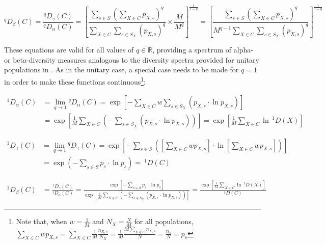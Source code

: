 \begin{equation}
^qD_\beta(C) = \frac{^qD_\gamma(C)}{^qD_\alpha(C)}
= \left[
\frac{\displaystyle\sum_{s \in S}\left(\sum_{X \in C} p_{X,s}\right)^q}{\displaystyle \sum_{X \in C}\sum_{s \in S_X} (p_{X,s})^q}
\times
\frac{\displaystyle M}{\displaystyle M^q}
\right]^\frac{1}{1-q}
= \left[
\frac{\displaystyle\sum_{s \in S}\left(\sum_{X \in C} p_{X,s}\right)^q}{\displaystyle M^{q-1} \sum_{X \in C}\sum_{s \in S_X} (p_{X,s})^q}
\right]^\frac{1}{1-q}
\label{eq:diversity_beta_even}
\end{equation}

These equations are valid for all values of $q \in \mathbb{R}$, providing a spectrum of alpha- or beta-diversity measures analogous to the diversity spectra provided for unitary populations in . As in the unitary case, a special case needs to be made for $q = 1$ in order to make these functions continuous\footnote{Note that, when $w = \frac{1}{M}$ and $N_X = \frac{N}{M}$ for all populations, $\displaystyle\sum_{X \in C}wp_{X,s} = \sum_{X \in C}\frac{1}{M}\frac{n_{X,s}}{N_X} = \frac{1}{M}\frac{M \sum_{X \in C} n_{X,s}}{N} = \frac{n_{s}}{N} = p_s$}:

\begin{equation}
\begin{split}
^1D_\alpha(C) & = \lim_{q \to 1} {^qD}_\alpha(C)
= \exp\left[-\sum_{X \in C}w\sum_{s \in S_X}(p_{X,s}\cdot\ln p_{X,s})\right]\\
 & = \exp\left[\frac{1}{M}\sum_{X \in C}\left(-\sum_{s \in S_X}(p_{X,s}\cdot\ln p_{X,s})\right)\right] = \exp\left[\frac{1}{M}\sum_{X \in C}\ln\,^1D(X)\right]
\end{split}
\label{eq:diversity_alpha_q1}
\end{equation}

\begin{equation}
\begin{split}
^1D_\gamma(C) & = \lim_{q \to 1} {^qD}_\gamma(C)
= \exp\left[-\sum_{s \in S}\left(\left[\sum_{X \in C}wp_{X,s}\right]\cdot\ln \left[\sum_{X \in C}wp_{X,s}\right]\right)\right]\\
& = \exp\left(-\sum_{s \in S}p_s \cdot\ln p_s\right) =\:^1D(C)
\end{split}
\label{eq:diversity_gamma_q1}
\end{equation}

\begin{equation}
\begin{split}
^1D_\beta(C) & = \frac{^1D_\gamma(C)}{^1D_\alpha(C)} = \frac{\exp\left[-\sum_{s \in S}p_s \cdot\ln p_s\right]}{\exp\left[\frac{1}{M}\sum_{X \in C}\left(-\sum_{s \in S_X}(p_{X,s}\cdot\ln p_{X,s})\right)\right]} = \frac{\exp\left[\frac{1}{M}\sum_{X \in C}\ln\,^1D(X)\right]}{^1D(C)}
\end{split}
\label{eq:diversity_beta_q1}
\end{equation}

